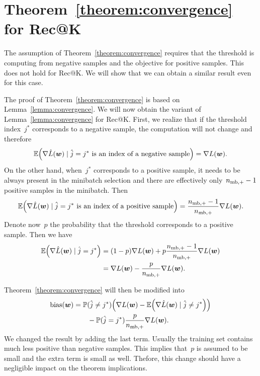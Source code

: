 \section{Theorem~\ref{theorem:convergence} for Rec@K}

The assumption of Theorem~\ref{theorem:convergence} requires that the threshold is computing from negative samples and the objective for positive samples. This does not hold for Rec@K. We will show that we can obtain a similar result even for this case.

The proof of Theorem~\ref{theorem:convergence} is based on Lemma~\ref{lemma:convergence}. We will now obtain the variant of Lemma~\ref{lemma:convergence} for Rec@K. First, we realize that if the threshold index~$j^*$ corresponds to a negative sample, the computation will not change and therefore
\begin{equation*}
  \EE\Brac{\nabla \hat L(\bm w) \mid \hat j=j^*\text{ is an index of a negative sample}}
  =  \nabla L(\bm w).
\end{equation*}
On the other hand, when~$j^*$ corresponds to a positive sample, it needs to be always present in the minibatch selection and there are effectively only~$n_{\text{mb},+}-1$ positive samples in the minibatch. Then
\begin{equation*}
  \EE\Brac{\nabla \hat L(\bm w) \mid \hat j=j^*\text{ is an index of a positive sample}}
  = \frac{\nmbpos-1}{\nmbpos}\nabla L(\bm w).
\end{equation*}
Denote now~$p$ the probability that the threshold corresponds to a positive sample. Then we have
\begin{equation*}
  \begin{aligned}
    \EE\Brac{\nabla \hat L(\bm w) \mid \hat j=j^*}
    & = (1-p)\nabla L(\bm w) + p\frac{\nmbpos-1}{\nmbpos}\nabla L(\bm w) \\
    & = \nabla L(\bm w) - \frac{p}{\nmbpos}\nabla L(\bm w).
\end{aligned}
\end{equation*}

Theorem~\ref{theorem:convergence} will then be modified into
\begin{equation*}
  \begin{aligned}
    \bias(\bm w)
    & = \PP(\hat j\neq j^*) \Brac{\nabla L(\bm w) - \EE\Brac{\nabla \hat L(\bm w) \mid \hat j\neq j^*}} \\
    & \qquad - \PP(\hat j= j^*)\frac{p}{\nmbpos}\nabla L(\bm w).
  \end{aligned}
\end{equation*}
We changed the result by adding the last term. Usually the training set contains much less positive than negative samples. This implies that~$p$ is assumed to be small and the extra term is small as well. Thefore, this change should have a negligible impact on the theorem implications.
